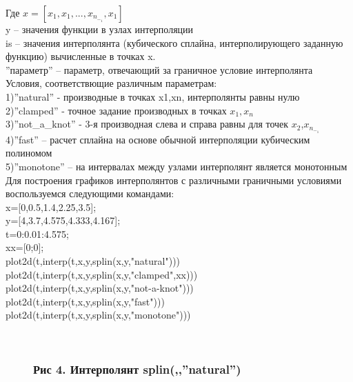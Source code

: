 \documentclass[russian,utf8,nocolumnxxxi,nocolumnxxxii]{eskdtext}
\begin{document}
Где $x=[x_1,x_1,...,x_n_-_1,x_1]$\\
y – значения функции в узлах интерполяции\\
is – значения интерполянта (кубического сплайна, интерполирующего заданную функцию) вычисленные в точках x.\\
”параметр” – параметр, отвечающий за граничное условие интерполянта\\
Условия, соответствющие различным параметрам:\\
1)”natural” - производные в точках x1,xn, интерполянты равны нулю\\
2)”clamped” - точное задание производных в точках $x_1,x_n$\\
3)”not\_a\_knot” - 3-я производная слева и справа равны для точек $x_2$,$x_n_-_1$\\
4)”fast” – расчет сплайна на основе обычной интерполяции кубическим полиномом\\
5)”monotone” – на интервалах между узлами интерполянт является монотонным\\
Для построения графиков интерполянтов с различными граничными условиями воспользуемся следующими командами:\\
x=[0,0.5,1.4,2.25,3.5];\\
y=[4,3.7,4.575,4.333,4.167];\\
t=0:0.01:4.575;\\
xx=[0;0];\\
plot2d(t,interp(t,x,y,splin(x,y,"natural")))\\
plot2d(t,interp(t,x,y,splin(x,y,"clamped",xx)))\\
plot2d(t,interp(t,x,y,splin(x,y,"not-a-knot")))\\
plot2d(t,interp(t,x,y,splin(x,y,"fast")))\\
plot2d(t,interp(t,x,y,splin(x,y,"monotone")))\\
\newpage
\begin{figure}[H]
\begin{center}
\begin{minipage}[h]{0.70\linewidth}
  \\
\frametitle{Рис 4. Интерполянт splin(,,”natural”)}
\end{minipage}
\end{center}
\end{figure}
\end{document}
